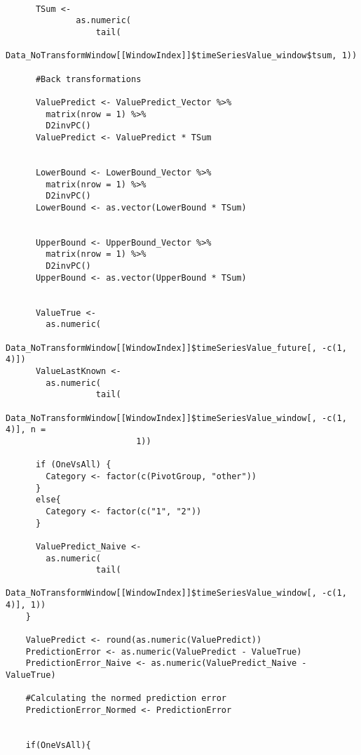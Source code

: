 \begin{verbatim}
      
      TSum <- 
			  as.numeric(
				  tail(
					 Data_NoTransformWindow[[WindowIndex]]$timeSeriesValue_window$tsum, 1))
      
      #Back transformations
      
      ValuePredict <- ValuePredict_Vector %>%
        matrix(nrow = 1) %>%
        D2invPC()
      ValuePredict <- ValuePredict * TSum
      
      
      LowerBound <- LowerBound_Vector %>%
        matrix(nrow = 1) %>%
        D2invPC()
      LowerBound <- as.vector(LowerBound * TSum)
      
      
      UpperBound <- UpperBound_Vector %>%
        matrix(nrow = 1) %>%
        D2invPC()
      UpperBound <- as.vector(UpperBound * TSum)
      
      
      ValueTrue <-
        as.numeric(
				  Data_NoTransformWindow[[WindowIndex]]$timeSeriesValue_future[, -c(1, 4)])
      ValueLastKnown <-
        as.numeric(
				  tail(
					 Data_NoTransformWindow[[WindowIndex]]$timeSeriesValue_window[, -c(1, 4)], n =
                          1))
      
      if (OneVsAll) {
        Category <- factor(c(PivotGroup, "other"))
      }
      else{
        Category <- factor(c("1", "2"))
      }
      
      ValuePredict_Naive <-
        as.numeric(
				  tail(
					 Data_NoTransformWindow[[WindowIndex]]$timeSeriesValue_window[, -c(1, 4)], 1))
    }
    
    ValuePredict <- round(as.numeric(ValuePredict))
    PredictionError <- as.numeric(ValuePredict - ValueTrue)
    PredictionError_Naive <- as.numeric(ValuePredict_Naive - ValueTrue)
    
    #Calculating the normed prediction error
    PredictionError_Normed <- PredictionError
    
    
    if(OneVsAll){
      

\end{verbatim}
